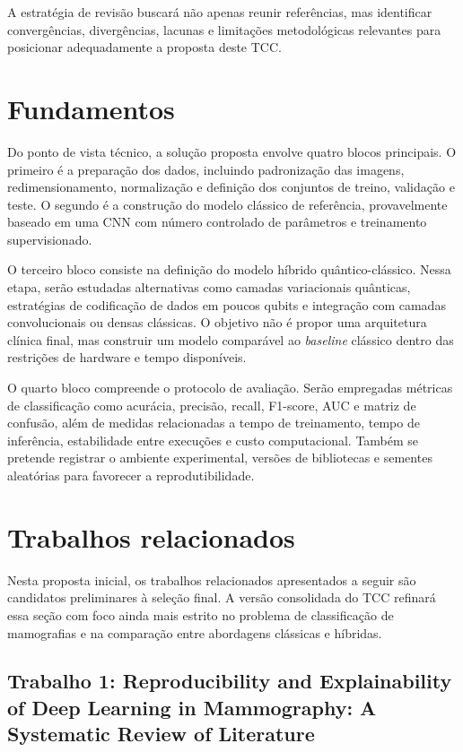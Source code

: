 \documentclass[
    12pt,
    openright,
    oneside,
    a4paper,
    english,
    brazil
]{abntex2}
\begin{document}
A estratégia de revisão buscará não apenas reunir referências, mas identificar convergências, divergências, lacunas e limitações metodológicas relevantes para posicionar adequadamente a proposta deste TCC.

\section{Fundamentos}
\label{sec:fundamentos}

Do ponto de vista técnico, a solução proposta envolve quatro blocos principais. O primeiro é a preparação dos dados, incluindo padronização das imagens, redimensionamento, normalização e definição dos conjuntos de treino, validação e teste. O segundo é a construção do modelo clássico de referência, provavelmente baseado em uma CNN com número controlado de parâmetros e treinamento supervisionado.

O terceiro bloco consiste na definição do modelo híbrido quântico-clássico. Nessa etapa, serão estudadas alternativas como camadas variacionais quânticas, estratégias de codificação de dados em poucos qubits e integração com camadas convolucionais ou densas clássicas. O objetivo não é propor uma arquitetura clínica final, mas construir um modelo comparável ao \textit{baseline} clássico dentro das restrições de hardware e tempo disponíveis.

O quarto bloco compreende o protocolo de avaliação. Serão empregadas métricas de classificação como acurácia, precisão, recall, F1-score, AUC e matriz de confusão, além de medidas relacionadas a tempo de treinamento, tempo de inferência, estabilidade entre execuções e custo computacional. Também se pretende registrar o ambiente experimental, versões de bibliotecas e sementes aleatórias para favorecer a reprodutibilidade.

\section{Trabalhos relacionados}
\label{sec:trabalhos_relacionados}

Nesta proposta inicial, os trabalhos relacionados apresentados a seguir são candidatos preliminares à seleção final. A versão consolidada do TCC refinará essa seção com foco ainda mais estrito no problema de classificação de mamografias e na comparação entre abordagens clássicas e híbridas.

\subsection{Trabalho 1: Reproducibility and Explainability of Deep Learning in Mammography: A Systematic Review of Literature}
\end{document}
